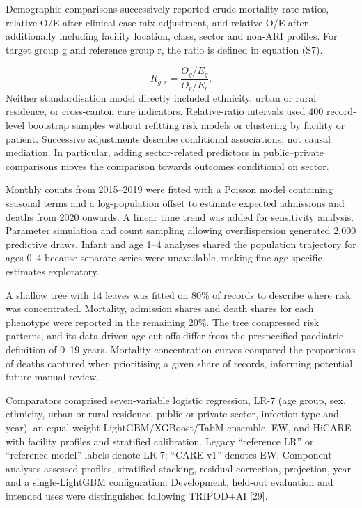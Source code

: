 \documentclass[11pt,a4paper]{article}
\newcommand{\subheading}[1]{\par\needspace{3\baselineskip}\vspace{5pt}{\bfseries #1}\par\vspace{1pt}}
\begin{document}
Demographic comparisons successively reported crude mortality rate ratios, relative O/E after clinical case-mix adjustment, and relative O/E after additionally including facility location, class, sector and non-ARI profiles. For target group g and reference group r, the ratio is defined in equation (S7).

\begin{equation}
R_{g:r}=\frac{O_g/E_g}{O_r/E_r}.
\end{equation}
Neither standardisation model directly included ethnicity, urban or rural residence, or cross-canton care indicators. Relative-ratio intervals used 400 record-level bootstrap samples without refitting risk models or clustering by facility or patient. Successive adjustments describe conditional associations, not causal mediation. In particular, adding sector-related predictors in public–private comparisons moves the comparison towards outcomes conditional on sector.

\subheading{S1.8 Paediatric demand and interpretable risk groups}
Monthly counts from 2015–2019 were fitted with a Poisson model containing seasonal terms and a log-population offset to estimate expected admissions and deaths from 2020 onwards. A linear time trend was added for sensitivity analysis. Parameter simulation and count sampling allowing overdispersion generated 2,000 predictive draws. Infant and age 1–4 analyses shared the population trajectory for ages 0–4 because separate series were unavailable, making fine age-specific estimates exploratory.

A shallow tree with 14 leaves was fitted on 80\% of records to describe where risk was concentrated. Mortality, admission shares and death shares for each phenotype were reported in the remaining 20\%. The tree compressed risk patterns, and its data-driven age cut-offs differ from the prespecified paediatric definition of 0–19 years. Mortality-concentration curves compared the proportions of deaths captured when prioritising a given share of records, informing potential future manual review.

\subheading{S1.9 Evaluation tasks and comparator configurations}
Comparators comprised seven-variable logistic regression, LR-7 (age group, sex, ethnicity, urban or rural residence, public or private sector, infection type and year), an equal-weight LightGBM/XGBoost/TabM ensemble, EW, and HiCARE with facility profiles and stratified calibration. Legacy “reference LR” or “reference model” labels denote LR-7; “CARE v1” denotes EW. Component analyses assessed profiles, stratified stacking, residual correction, projection, year and a single-LightGBM configuration. Development, held-out evaluation and intended uses were distinguished following TRIPOD+AI [29].
\end{document}
